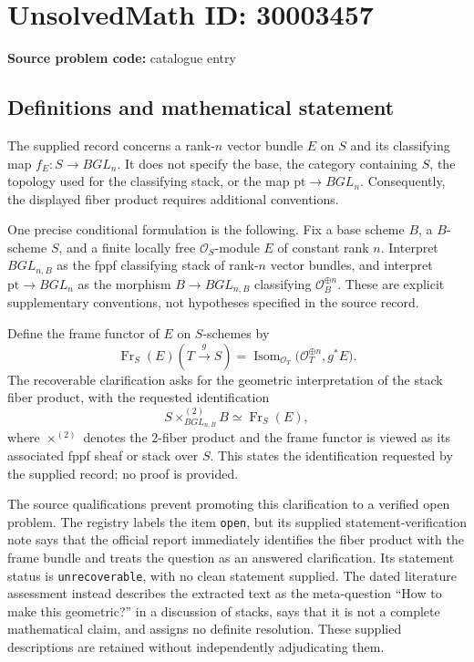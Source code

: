 \documentclass[11pt]{article}
\begin{document}
\section*{UnsolvedMath ID: 30003457}
\textbf{Source problem code:} catalogue entry
\subsection{Definitions and mathematical statement}
The supplied record concerns a rank-\(n\) vector bundle \(E\) on \(S\) and its classifying map \(f_E:S\to BGL_n\). It does not specify the base, the category containing \(S\), the topology used for the classifying stack, or the map \(\mathrm{pt}\to BGL_n\). Consequently, the displayed fiber product requires additional conventions.

One precise conditional formulation is the following. Fix a base scheme \(B\), a \(B\)-scheme \(S\), and a finite locally free \(\mathcal O_S\)-module \(E\) of constant rank \(n\). Interpret \(BGL_{n,B}\) as the fppf classifying stack of rank-\(n\) vector bundles, and interpret \(\mathrm{pt}\to BGL_n\) as the morphism \(B\to BGL_{n,B}\) classifying \(\mathcal O_B^{\oplus n}\). These are explicit supplementary conventions, not hypotheses specified in the source record.

Define the frame functor of \(E\) on \(S\)-schemes by
\[
\operatorname{Fr}_S(E)(T\xrightarrow{g}S)
=
\operatorname{Isom}_{\mathcal O_T}
\bigl(\mathcal O_T^{\oplus n},g^*E\bigr).
\]
The recoverable clarification asks for the geometric interpretation of the stack fiber product, with the requested identification
\[
S\mathbin{\times^{(2)}_{BGL_{n,B}}}B
\simeq
\operatorname{Fr}_S(E),
\]
where \(\times^{(2)}\) denotes the \(2\)-fiber product and the frame functor is viewed as its associated fppf sheaf or stack over \(S\). This states the identification requested by the supplied record; no proof is provided.

The source qualifications prevent promoting this clarification to a verified open problem. The registry labels the item \texttt{open}, but its supplied statement-verification note says that the official report immediately identifies the fiber product with the frame bundle and treats the question as an answered clarification. Its statement status is \texttt{unrecoverable}, with no clean statement supplied. The dated literature assessment instead describes the extracted text as the meta-question ``How to make this geometric?'' in a discussion of stacks, says that it is not a complete mathematical claim, and assigns no definite resolution. These supplied descriptions are retained without independently adjudicating them.
\end{document}
